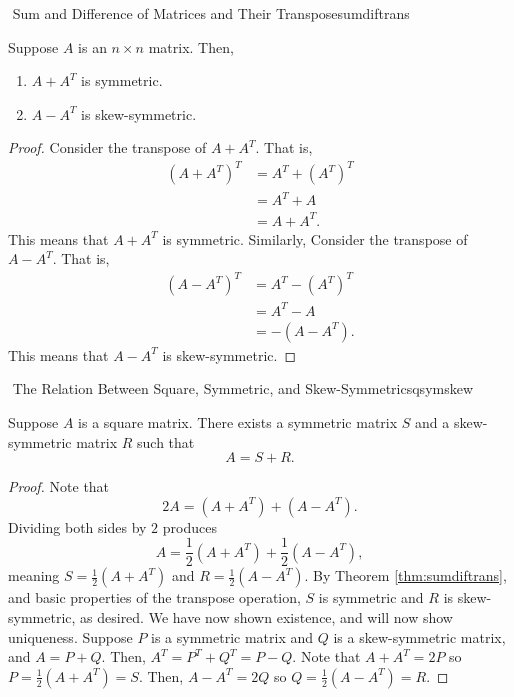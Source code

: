         \begin{theorem}{\Stop\,\,Sum and Difference of Matrices and Their Transpose}{sumdiftrans}
        
            Suppose \(A\) is an \(n\times n\) matrix. Then,
            \begin{enumerate}
                \item \(A+A^T\) is symmetric.
                \item \(A-A^T\) is skew-symmetric.
            \end{enumerate}
            \begin{proof}
                Consider the transpose of \(A+A^T\). That is,
                \begin{align*}
                    (A+A^T)^T&=A^T+(A^T)^T \\
                    &=A^T+A \\
                    &=A+A^T.
                \end{align*}
                This means that \(A+A^T\) is symmetric. Similarly, Consider the transpose of \(A-A^T\). That is,
                \begin{align*}
                    (A-A^T)^T&=A^T-(A^T)^T \\
                    &=A^T-A \\
                    &=-(A-A^T).
                \end{align*}
                This means that \(A-A^T\) is skew-symmetric.
            \end{proof}
        \end{theorem}
        \begin{theorem}{\Stop\,\,The Relation Between Square, Symmetric, and Skew-Symmetric}{sqsymskew}
        
            Suppose \(A\) is a square matrix. There exists a symmetric matrix \(S\) and a skew-symmetric matrix \(R\) such that
            \begin{equation*}
                A=S+R.
            \end{equation*}
            \begin{proof}
                Note that
                \begin{equation*}
                    2A=(A+A^T)+(A-A^T).
                \end{equation*}
                Dividing both sides by \(2\) produces
                \begin{equation*}
                    A=\frac{1}{2}(A+A^T)+\frac{1}{2}(A-A^T),
                \end{equation*}
                meaning \(S=\frac{1}{2}(A+A^T)\) and \(R=\frac{1}{2}(A-A^T)\). By Theorem \ref{thm:sumdiftrans}, and basic properties of the transpose operation, \(S\) is symmetric and \(R\) is skew-symmetric, as desired. We have now shown existence, and will now show uniqueness. Suppose \(P\) is a symmetric matrix and \(Q\) is a skew-symmetric matrix, and \(A=P+Q\). Then, \(A^T=P^T+Q^T=P-Q\). Note that \(A+A^T=2P\) so \(P=\frac{1}{2}(A+A^T)=S\). Then, \(A-A^T=2Q\) so \(Q=\frac{1}{2}(A-A^T)=R\). 
            \end{proof}
        \end{theorem}
        
